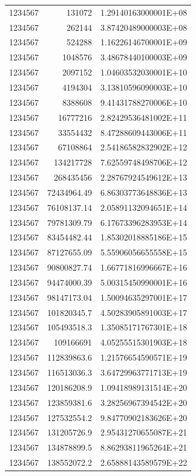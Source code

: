 \begin{center}
\begin{longtable}{lrr}
1234567 & 131072 & 1.29140163000001E+08 \\
1234567 & 262144 & 3.87420489000003E+08 \\
1234567 & 524288 & 1.16226146700001E+09 \\
1234567 & 1048576 & 3.48678440100003E+09 \\
1234567 & 2097152 & 1.04603532030001E+10 \\
1234567 & 4194304 & 3.13810596090003E+10 \\
1234567 & 8388608 & 9.41431788270006E+10 \\
1234567 & 16777216 & 2.82429536481002E+11 \\
1234567 & 33554432 & 8.47288609443006E+11 \\
1234567 & 67108864 & 2.54186582832902E+12 \\
1234567 & 134217728 & 7.62559748498706E+12 \\
1234567 & 268435456 & 2.28767924549612E+13 \\
1234567 & 72434964.49 & 6.86303773648836E+13 \\
1234567 & 76108137.14 & 2.05891132094651E+14 \\
1234567 & 79781309.79 & 6.17673396283953E+14 \\
1234567 & 83454482.44 & 1.85302018885186E+15 \\
1234567 & 87127655.09 & 5.55906056655558E+15 \\
1234567 & 90800827.74 & 1.66771816996667E+16 \\
1234567 & 94474000.39 & 5.00315450990001E+16 \\
1234567 & 98147173.04 & 1.50094635297001E+17 \\
1234567 & 101820345.7 & 4.50283905891003E+17 \\
1234567 & 105493518.3 & 1.35085171767301E+18 \\
1234567 & 109166691 & 4.05255515301903E+18 \\
1234567 & 112839863.6 & 1.21576654590571E+19 \\
1234567 & 116513036.3 & 3.64729963771713E+19 \\
1234567 & 120186208.9 & 1.09418989131514E+20 \\
1234567 & 123859381.6 & 3.28256967394542E+20 \\
1234567 & 127532554.2 & 9.84770902183626E+20 \\
1234567 & 131205726.9 & 2.95431270655087E+21 \\
1234567 & 134878899.5 & 8.86293811965264E+21 \\
1234567 & 138552072.2 & 2.65888143589579E+22 \\

\end{longtable}
\end{center}
